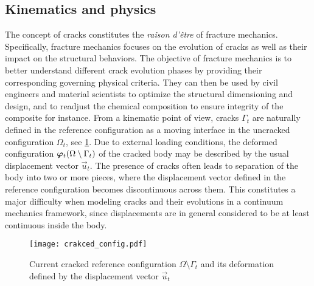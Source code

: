 \subsection{Kinematics and physics} \label{sec:kinematics}
The concept of cracks constitutes the \emph{raison d'être} of fracture mechanics. Specifically, fracture mechanics focuses on the evolution of cracks as well as their impact on the structural behaviors. The objective of fracture mechanics is to better understand different crack evolution phases by providing their corresponding governing physical criteria. They can then be used by civil engineers and material scientists to optimize the structural dimensioning and design, and to readjust the chemical composition to ensure integrity of the composite for instance. From a kinematic point of view, cracks $\Gamma_t$ are naturally defined in the reference configuration as a moving interface in the uncracked configuration $\Omega_t$, see \cref{fig:crackedconfig}. Due to external loading conditions, the deformed configuration $\vphi_t(\Omega\setminus\Gamma_t)$ of the cracked body may be described by the usual displacement vector $\vec{u}_t$. The presence of cracks often leads to separation of the body into two or more pieces, where the displacement vector defined in the reference configuration becomes discontinuous across them. This constitutes a major difficulty when modeling cracks and their evolutions in a continuum mechanics framework, since displacements are in general considered to be at least continuous inside the body.
\begin{figure}[htbp]
\centering
\texttt{[image: crakced\_config.pdf]}
\caption{Current cracked reference configuration $\Omega\setminus\Gamma_t$ and its deformation defined by the displacement vector $\vec{u}_t$} \label{fig:crackedconfig}
\end{figure}

